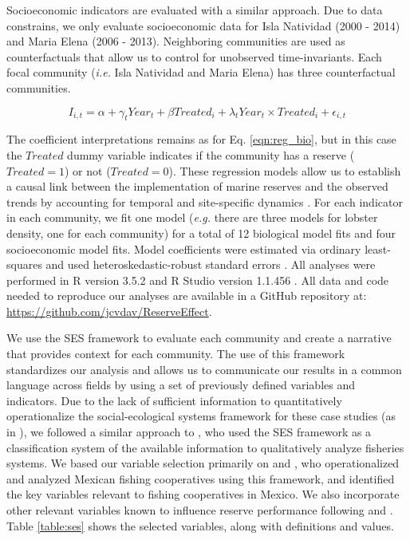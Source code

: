 \documentclass{frontiersSCNS}
\begin{document}
Socioeconomic indicators are evaluated with a similar approach. Due to data constrains, we only evaluate socioeconomic data for Isla Natividad (2000 - 2014) and Maria Elena (2006 - 2013). Neighboring communities are used as counterfactuals that allow us to control for unobserved time-invariants. Each focal community (\emph{i.e.} Isla Natividad and Maria Elena) has three counterfactual communities.

\begin{equation}
I_{i,t} = \alpha + \gamma_{t} Year_t + \beta Treated_i + \lambda_{t} Year_t\times Treated_i +\epsilon_{i,t}
\label{eqn:soc_reg}
\end{equation}

The coefficient interpretations remains as for Eq. \ref{eqn:reg_bio}, but in this case the \(Treated\) dummy variable indicates if the community has a reserve (\(Treated = 1\)) or not (\(Treated = 0\)). These regression models allow us to establish a causal link between the implementation of marine reserves and the observed trends by accounting for temporal and site-specific dynamics \citep{depalma_2018}. For each indicator in each community, we fit one model (\emph{e.g.} there are three models for lobster density, one for each community) for a total of 12 biological model fits and four socioeconomic model fits. Model coefficients were estimated via ordinary least-squares and used heteroskedastic-robust standard errors \citep{zeileis_2004-7n}. All analyses were performed in R version 3.5.2 and R Studio version 1.1.456 \citep{R_2018}. All data and code needed to reproduce our analyses are available in a GitHub repository at: \url{https://github.com/jcvdav/ReserveEffect}.

We use the SES framework to evaluate each community and create a narrative that provides context for each community. The use of this framework standardizes our analysis and allows us to communicate our results in a common language across fields by using a set of previously defined variables and indicators. Due to the lack of sufficient information to quantitatively operationalize the social-ecological systems framework for these case studies (as in \citet{leslie_2015-na}), we followed a similar approach to \citet{basurto_2013-oq}, who used the SES framework as a classification system of the available information to qualitatively analyze fisheries systems. We based our variable selection primarily on \citet{leslie_2015-na} and \citet{basurto_2013-oq}, who operationalized and analyzed Mexican fishing cooperatives using this framework, and identified the key variables relevant to fishing cooperatives in Mexico. We also incorporate other relevant variables known to influence reserve performance following \citet{difranco_2016-Xw} and \citet{edgar_2014-UO}. Table \ref{table:ses} shows the selected variables, along with definitions and values.
\end{document}
